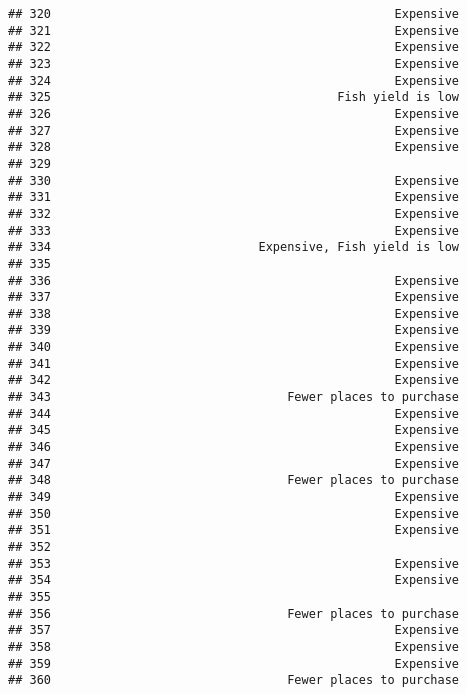 \documentclass[
]{article}
\begin{document}
\begin{verbatim}
## 320                                                Expensive
## 321                                                Expensive
## 322                                                Expensive
## 323                                                Expensive
## 324                                                Expensive
## 325                                        Fish yield is low
## 326                                                Expensive
## 327                                                Expensive
## 328                                                Expensive
## 329                                                         
## 330                                                Expensive
## 331                                                Expensive
## 332                                                Expensive
## 333                                                Expensive
## 334                             Expensive, Fish yield is low
## 335                                                         
## 336                                                Expensive
## 337                                                Expensive
## 338                                                Expensive
## 339                                                Expensive
## 340                                                Expensive
## 341                                                Expensive
## 342                                                Expensive
## 343                                 Fewer places to purchase
## 344                                                Expensive
## 345                                                Expensive
## 346                                                Expensive
## 347                                                Expensive
## 348                                 Fewer places to purchase
## 349                                                Expensive
## 350                                                Expensive
## 351                                                Expensive
## 352                                                         
## 353                                                Expensive
## 354                                                Expensive
## 355                                                         
## 356                                 Fewer places to purchase
## 357                                                Expensive
## 358                                                Expensive
## 359                                                Expensive
## 360                                 Fewer places to purchase

\end{verbatim}
\end{document}
